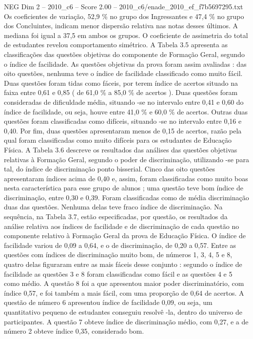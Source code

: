 \begin{textsample}{NEG Dim 2 – 2010\_c6 – Score 2.00 – 2010\_c6/enade\_2010\_ef\_f7b5697295.txt}
Os coeficientes de variação, 52,9 \% no grupo dos Ingressantes e 47,4 \% no grupo dos Concluintes, indicam menor dispersão relativa nas notas desses últimos.
A mediana foi igual a 37,5 em ambos os grupos.
O coeficiente de assimetria do total de estudantes revelou comportamento simétrico.
A Tabela 3.5 apresenta as classificações das questões objetivas do componente de Formação Geral, segundo o índice de facilidade.
As questões objetivas da prova foram assim avaliadas : das oito questões, nenhuma teve o índice de facilidade classificado como muito fácil.
Duas questões foram tidas como fáceis, por terem índice de acertos situado na faixa entre 0,61 e 0,85 ( de 61,0 \% a 85,0 \% de acertos ).
Duas questões foram consideradas de dificuldade média, situando -se no intervalo entre 0,41 e 0,60 do índice de facilidade, ou seja, houve entre 41,0 \% e 60,0 \% de acertos.
Outras duas questões foram classificadas como difíceis, situando -se no intervalo entre 0,16 e 0,40.
Por fim, duas questões apresentaram menos de 0,15 de acertos, razão pela qual foram classificadas como muito difíceis para os estudantes de Educação Física.
A Tabela 3.6 descreve os resultados das análises das questões objetivas relativas à Formação Geral, segundo o poder de discriminação, utilizando -se para tal, do índice de discriminação ponto bisserial.
Cinco das oito questões apresentaram índices acima de 0,40 e, assim, foram classificadas como muito boas nesta característica para esse grupo de alunos ; uma questão teve bom índice de discriminação, entre 0,30 e 0,39.
Foram classificadas como de média discriminação duas das questões.
Nenhuma delas teve fraco índice de discriminação.
Na sequência, na Tabela 3.7, estão especificadas, por questão, os resultados da análise relativa aos índices de facilidade e de discriminação de cada questão no componente relativo à Formação Geral da prova de Educação Física.
O índice de facilidade variou de 0,09 a 0,64, e o de discriminação, de 0,20 a 0,57.
Entre as questões com índices de discriminação muito bom, de números 1, 3, 4, 5 e 8, quatro delas figuraram entre as mais fáceis desse conjunto : segundo o índice de facilidade as questões 3 e 8 foram classificadas como fácil e as questões 4 e 5 como médio.
A questão 8 foi a que apresentou maior poder discriminatório, com índice 0,57, e foi também a mais fácil, com uma proporção de 0,64 de acertos.
A questão de número 6 apresentou índice de facilidade 0,09, ou seja, um quantitativo pequeno de estudantes conseguiu resolvê -la, dentro do universo de participantes.
A questão 7 obteve índice de discriminação médio, com 0,27, e a de número 2 obteve índice 0,35, considerado bom.

\end{textsample}
